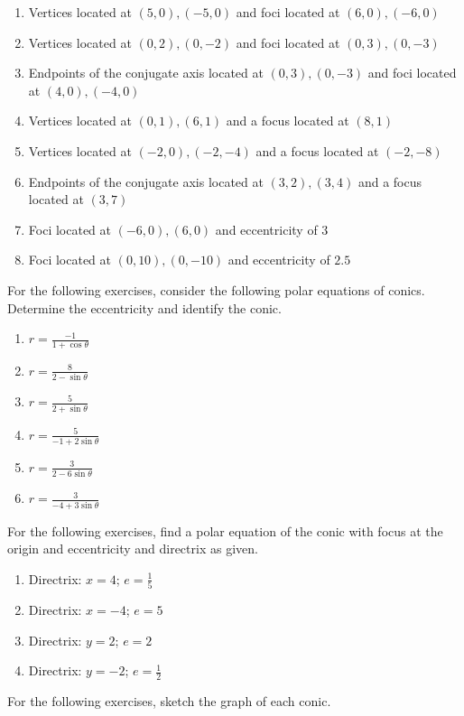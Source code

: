 \documentclass{exercises}
\begin{document}
\begin{enumerate}[resume]
\item Vertices located at $(5,0),(-5,0)$ and foci located at $(6,0),(-6,0)$
\item Vertices located at $(0,2),(0,-2)$ and foci located at $(0,3),(0,-3)$
\item Endpoints of the conjugate axis located at $(0,3),(0,-3)$ and foci located at $(4,0),(-4,0)$
\item Vertices located at $(0,1),(6,1)$ and a focus located at $(8,1)$
\item Vertices located at $(-2,0),(-2,-4)$ and a focus located at $(-2,-8)$
\item Endpoints of the conjugate axis located at $(3,2),(3,4)$ and a focus located at $(3,7)$
\item Foci located at $(-6,0),(6,0)$ and eccentricity of $3$
\item Foci located at $(0,10),(0,-10)$ and eccentricity of $2.5$
\end{enumerate}

For the following exercises, consider the following polar equations of conics. Determine the eccentricity and identify the conic.

\begin{enumerate}[resume]
\item $r=\frac{-1}{1+\cos \theta}$
\item $r=\frac{8}{2-\sin \theta}$
\item $r=\frac{5}{2+\sin \theta}$
\item $r=\frac{5}{-1+2\sin \theta}$
\item $r=\frac{3}{2-6\sin \theta}$
\item $r=\frac{3}{-4+3\sin \theta}$
\end{enumerate}

For the following exercises, find a polar equation of the conic with focus at the origin and eccentricity and directrix as given.

\begin{enumerate}[resume]
\item Directrix: $x=4$; $e=\frac{1}{5}$
\item Directrix: $x=-4$; $e=5$
\item Directrix: $y=2$; $e=2$
\item Directrix: $y=-2$; $e=\frac{1}{2}$
\end{enumerate}

For the following exercises, sketch the graph of each conic.
\end{document}
